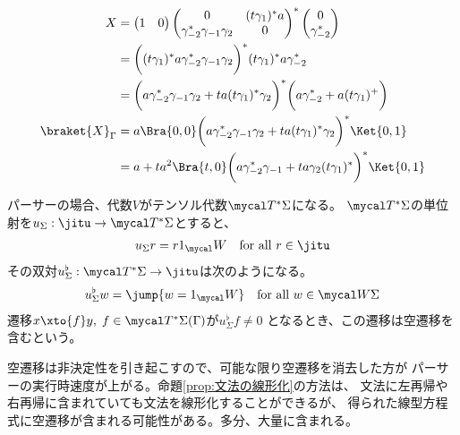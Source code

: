 {\begin{todo}[式の計算]
		\begin{equation*}\begin{split}
			X &= \begin{pmatrix}
				1 & 0
			\end{pmatrix}\begin{pmatrix}
				0 & (t\gamma_1)^*a \\ \gamma_{-2}^*\gamma_{-1}\gamma_2 & 0
			\end{pmatrix}^*\begin{pmatrix}
				0 \\ \gamma_{-2}^*
			\end{pmatrix} \\
			&= \biggl((t\gamma_1)^*a\gamma_{-2}^*\gamma_{-1}\gamma_2\biggr)^*
				(t\gamma_1)^*a\gamma_{-2}^* \\
			&= \biggl(a\gamma_{-2}^*\gamma_{-1}\gamma_2 
				+ ta(t\gamma_1)^*\gamma_2\biggr)^*
				\biggl(a\gamma_{-2}^* + a(t\gamma_1)^+\biggr) \\
			\braket{X}_\Gamma &= a\Bra{0,0}
				\biggl(a\gamma_{-2}^*\gamma_{-1}\gamma_2 
				+ ta(t\gamma_1)^*\gamma_2\biggr)^*\Ket{0,1} \\
			&= a + ta^2\Bra{t,0}
				\biggl(a\gamma_{-2}^*\gamma_{-1}
				+ ta\gamma_2(t\gamma_1)^*\biggr)^*\Ket{0,1} \\
		\end{split}\end{equation*}
	\end{todo} %
	
	\begin{todo}[空遷移の消去]\label{todo:空遷移の消去} %
		パーサーの場合、代数$V$がテンソル代数$\T^*\Sigma$になる。
		$\T^*\Sigma$の単位射を$u_\Sigma:\jitu\to\T^*\Sigma$とすると、
		\begin{equation*}\begin{split}
			u_\Sigma r = r1_\W \quad\text{for all } r\in\jitu
		\end{split}\end{equation*}
		その双対$u_\Sigma^\flat:\T^*\Sigma\to\jitu$は次のようになる。
		\begin{equation*}\begin{split}
			u_\Sigma^\flat w = \jump{w = 1_\W} \quad\text{for all } w\in\W\Sigma
		\end{split}\end{equation*}
		遷移$x\xto{f}y,\;f\in\T^*\Sigma(\Gamma)$が$u_\Sigma^\flat f\neq0$
		となるとき、この遷移は空遷移を含むという。
		
		空遷移は非決定性を引き起こすので、可能な限り空遷移を消去した方が
		パーサーの実行時速度が上がる。命題\ref{prop:文法の線形化}の方法は、
		文法に左再帰や右再帰に含まれていても文法を線形化することができるが、
		得られた線型方程式に空遷移が含まれる可能性がある。多分、大量に含まれる。
	\end{todo} %

}
